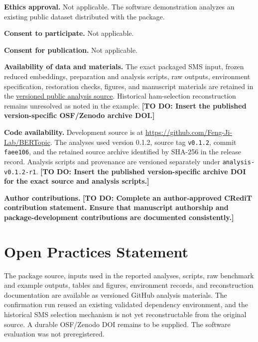 \documentclass[12pt]{article}
\newcommand{\fcode}[1]{\nolinkurl{#1}}
\newcommand{\todo}[1]{\textbf{[TO DO: #1]}}
\begin{document}
\textbf{Ethics approval.} Not applicable. The software demonstration analyzes an existing public dataset distributed with the package.

\textbf{Consent to participate.} Not applicable.

\textbf{Consent for publication.} Not applicable.

\textbf{Availability of data and materials.} The exact packaged SMS input, frozen reduced embeddings, preparation and analysis scripts, raw outputs, environment specification, restoration checks, figures, and manuscript materials are retained in the \href{https://github.com/Feng-Ji-Lab/BERTopic/tree/analysis-v0.1.2-r1}{versioned public analysis source}. Historical ham-selection reconstruction remains unresolved as noted in the example. \todo{Insert the published version-specific OSF/Zenodo archive DOI.}

\textbf{Code availability.} Development source is at \url{https://github.com/Feng-Ji-Lab/BERTopic}. The analyses used version 0.1.2, source tag \fcode{v0.1.2}, commit \fcode{faee106}, and the retained source archive identified by SHA-256 in the release record. Analysis scripts and provenance are versioned separately under \fcode{analysis-v0.1.2-r1}. \todo{Insert the published version-specific archive DOI for the exact source and analysis scripts.}

\textbf{Author contributions.} \todo{Complete an author-approved CRediT contribution statement. Ensure that manuscript authorship and package-development contributions are documented consistently.}

\section*{Open Practices Statement}

The package source, inputs used in the reported analyses, scripts, raw benchmark and example outputs, tables and figures, environment records, and reconstruction documentation are available as versioned GitHub analysis materials. The confirmation run reused an existing validated dependency environment, and the historical SMS selection mechanism is not yet reconstructable from the original source. A durable OSF/Zenodo DOI remains to be supplied. The software evaluation was not preregistered.

\printbibliography
\end{document}
